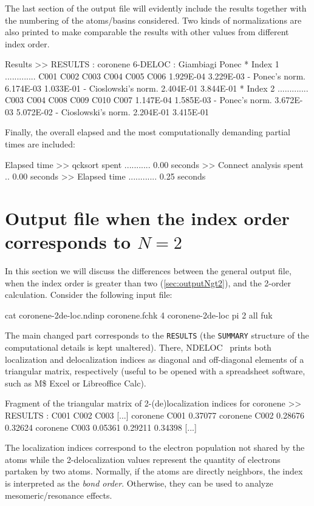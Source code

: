 \documentclass[a4paper,11pt,openany]{memoir}
\newcommand\programa{\textsc{NDELOC}}
\begin{document}
The last section of the output file will evidently include the results together with the numbering of the atoms/basins considered. Two kinds of normalizations are also printed to make comparable the results with other values from different index order.
\begin{recuadro}{Results}
>> RESULTS :
coronene 6-DELOC :                                        Giambiagi      Ponec
* Index   1 ............. C001 C002 C003 C004 C005 C006   1.929E-04  3.229E-03
-        Ponec's norm.                                    6.174E-03  1.033E-01
- Cioslowski's norm.                                      2.404E-01  3.844E-01
* Index   2 ............. C003 C004 C008 C009 C010 C007   1.147E-04  1.585E-03
-      Ponec's norm.                                      3.672E-03  5.072E-02
- Cioslowski's norm.                                      2.204E-01  3.415E-01
\end{recuadro}

Finally, the overall elapsed and the most computationally demanding partial times are included:
\begin{recuadro}{Elapsed time}
>> qcksort spent ........... 0.00 seconds
>> Connect analysis spent .. 0.00 seconds
>> Elapsed time ............ 0.25 seconds
\end{recuadro}

\section[Output file when $N=2$]{Output file when the index order corresponds to $N=2$}\label{sec:outputNeq2}
In this section we will discuss the differences between the general output file, when the index order is greater than two (\autoref{sec:outputNgt2}), and the 2-order calculation. Consider the following input file:
\begin{consola}{cat coronene-2de-loc.ndinp}
coronene.fchk 4
coronene-2de-loc
pi
2
all
fuk
\end{consola}
The main changed part corresponds to the {\texttt{RESULTS}} (the \texttt{SUMMARY} structure of the computational details is kept unaltered). There, \programa~ prints
 both localization and delocalization indices as diagonal and off-diagonal elements of a triangular matrix, respectively (useful to be opened with a spreadsheet software, such as M\$ Excel or Libreoffice Calc).
\begin{recuadro}{Fragment of the triangular matrix of 2-(de)localization indices for coronene}
>> RESULTS :
                   C001       C002       C003       [...]
coronene  C001     0.37077
coronene  C002     0.28676    0.32624
coronene  C003     0.05361    0.29211    0.34398
[...]
\end{recuadro}
The localization indices correspond to the electron population not shared by the atoms while the 2-delocalization values represent the quantity of electrons partaken by two atoms. Normally, if the atoms are directly neighbors, the index is interpreted as the \emph{bond order}. Otherwise, they can be used to analyze mesomeric/resonance effects.
\end{document}
